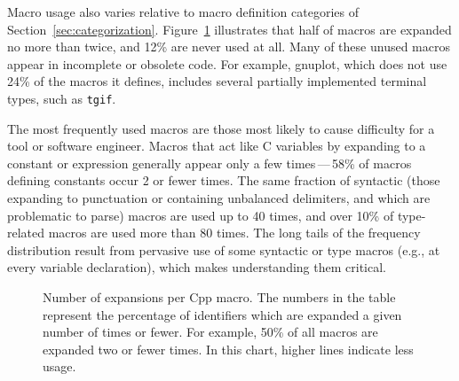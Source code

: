 \documentclass[10pt]{article}
\newcommand{\pkg}[1]{\textsf{#1}}
\newcommand{\captionsmall}[1]{\caption[]{\small #1}}
\begin{document}
Macro usage also varies relative to macro definition categories of
Section~\ref{sec:categorization}.  Figure~\ref{fig:freq-use-cat}
illustrates that half of macros are expanded no more than twice, and 12\% are
never used at all.  Many of these unused macros appear in incomplete or
obsolete code.  For example, \pkg{gnuplot}, which does not use 24\% of the
macros it defines, includes several partially implemented terminal types,
such as {\tt tgif}.

The most frequently used macros are those most likely to cause difficulty
for a tool or software engineer.  Macros that act like C variables by
expanding to a constant or expression generally appear only a few
times\,---\,58\% of macros defining constants occur 2 or fewer times.
The same fraction of syntactic (those expanding to punctuation or
containing unbalanced delimiters, and which are problematic to parse)
macros are used up to 40 times, and over 10\% of type-related macros are
used more than 80 times.  The long tails of the frequency distribution
result from pervasive use of some syntactic or type macros (e.g., at every
variable declaration), which makes understanding them critical.


\begin{figure}
\centerline{}
\captionsmall{Number of expansions per Cpp macro.  The numbers in the
  table represent the percentage of identifiers which are expanded a given
  number of times or fewer.  For example, 50\% of all macros are expanded
  two or fewer times.  In this chart, higher lines indicate less usage.}
\label{fig:freq-use-cat}
\end{figure}

\end{document}

